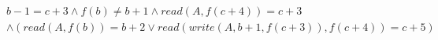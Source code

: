 \begin{align*}
%
& %
b - 1 = c + 3
%
\land
%
f(b)  \neq  b + 1
%
\land
%
\mathit{read}(A,f(c + 4)) = c + 3
~\\~
& %
%
\land
%
(\mathit{read}(A,f(b)) = b + 2 \lor \mathit{read}(\mathit{write}(A,b + 1,f(c + 3)),f(c + 4)) = c + 5)
%
\end{align*}
